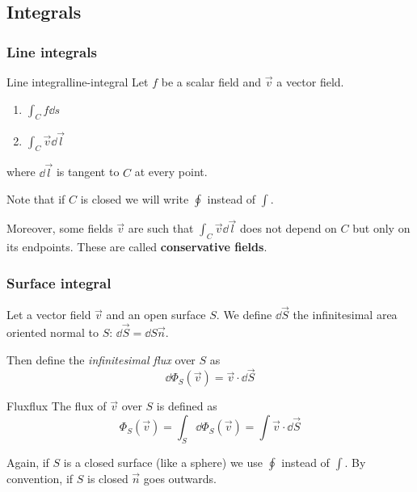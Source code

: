 \documentclass[12pt]{extarticle}
\begin{document}
\subsection{Integrals}

\subsubsection{Line integrals}

\begin{definition}{Line integral}{line-integral}
    Let $f$ be a scalar field and $\vec v$ a vector field.
    \begin{enumerate}
        \item $\int_C f \dd{s}$
        \item $\int_C \vec v \dd{\vec l}$
    \end{enumerate}
    where $\dd{\vec l}$ is tangent to $C$ at every point.
\end{definition}

Note that if $C$ is closed we will write $\oint$ instead of $\int$.

Moreover, some fields $\vec v$ are such that $\int_C \vec v \dd{\vec l}$ does not depend on $C$ but only on its endpoints.
These are called \textbf{conservative fields}.

\subsubsection{Surface integral}

Let a vector field $\vec v$ and an open surface $S$.
We define $\dd{\vec S}$ the infinitesimal area oriented normal to $S$: $\dd{\vec S} = \dd{S} \vec n$.

Then define the \textit{infinitesimal flux} over $S$ as
\begin{equation}
    \dd{\Phi_S(\vec v)} = \vec v \cdot \dd{\vec S}
\end{equation}

\begin{definition}{Flux}{flux}
    The flux of $\vec v$ over $S$ is defined as
    \begin{equation}
        \Phi_S(\vec v) = \int_S \dd{\Phi_S(\vec v)} = \int \vec v \cdot \dd{\vec S}
    \end{equation}
\end{definition}

Again, if $S$ is a closed surface (like a sphere) we use $\oint$ instead of $\int$.
By convention, if $S$ is closed $\vec n$ goes outwards.
\end{document}
